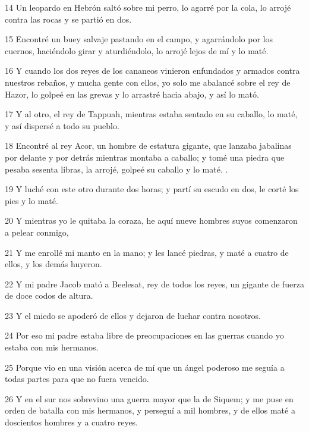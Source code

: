 \par 14 Un leopardo en Hebrón saltó sobre mi perro, lo agarré por la cola, lo arrojé contra las rocas y se partió en dos.

\par 15 Encontré un buey salvaje pastando en el campo, y agarrándolo por los cuernos, haciéndolo girar y aturdiéndolo, lo arrojé lejos de mí y lo maté.

\par 16 Y cuando los dos reyes de los cananeos vinieron enfundados y armados contra nuestros rebaños, y mucha gente con ellos, yo solo me abalancé sobre el rey de Hazor, lo golpeé en las grevas y lo arrastré hacia abajo, y así lo mató.

\par 17 Y al otro, el rey de Tappuah, mientras estaba sentado en su caballo, lo maté, y así dispersé a todo su pueblo.

\par 18 Encontré al rey Acor, un hombre de estatura gigante, que lanzaba jabalinas por delante y por detrás mientras montaba a caballo; y tomé una piedra que pesaba sesenta libras, la arrojé, golpeé su caballo y lo maté. .

\par 19 Y luché con este otro durante dos horas; y partí su escudo en dos, le corté los pies y lo maté.

\par 20 Y mientras yo le quitaba la coraza, he aquí nueve hombres suyos comenzaron a pelear conmigo,

\par 21 Y me enrollé mi manto en la mano; y les lancé piedras, y maté a cuatro de ellos, y los demás huyeron.

\par 22 Y mi padre Jacob mató a Beelesat, rey de todos los reyes, un gigante de fuerza de doce codos de altura.

\par 23 Y el miedo se apoderó de ellos y dejaron de luchar contra nosotros.

\par 24 Por eso mi padre estaba libre de preocupaciones en las guerras cuando yo estaba con mis hermanos.

\par 25 Porque vio en una visión acerca de mí que un ángel poderoso me seguía a todas partes para que no fuera vencido.

\par 26 Y en el sur nos sobrevino una guerra mayor que la de Siquem; y me puse en orden de batalla con mis hermanos, y perseguí a mil hombres, y de ellos maté a doscientos hombres y a cuatro reyes.

